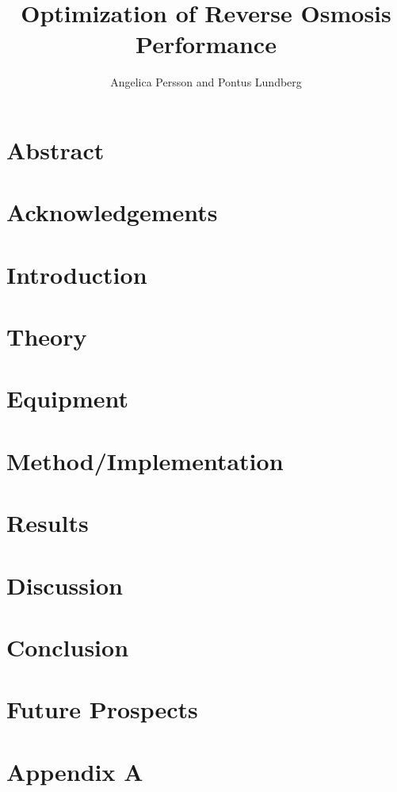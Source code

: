 \documentclass{LTHthesis}
\begin{document}
\begin{titlepages}
\author{Angelica Persson and Pontus Lundberg}
\title{Optimization of Reverse Osmosis Performance}
\end{titlepages}
\chapter{Abstract}

\chapter{Acknowledgements}


\tableofcontents




\chapter{Introduction}


\chapter{Theory}


\chapter{Equipment}


\chapter{Method/Implementation}


\chapter{Results}


\chapter{Discussion}


\chapter{Conclusion}


\chapter{Future Prospects}


\printbibliography 
\clearpage
\appendix
\chapter{Appendix A} 
\label{A}
%
\end{document}
